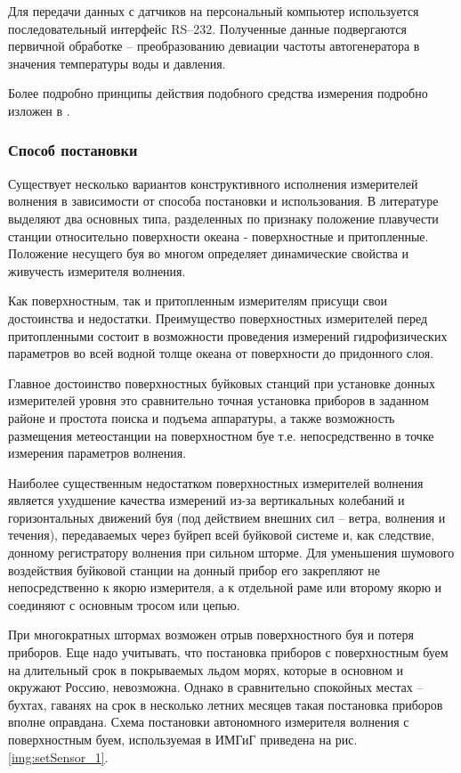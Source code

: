 
Для передачи данных с датчиков на персональный компьютер используется последовательный интерфейс RS–232. Полученные данные подвергаются первичной обработке – преобразованию девиации частоты автогенератора в значения температуры воды и давления.

Более подробно принципы действия подобного средства измерения подробно изложен в \cite{kovalev1993}.


\subsubsection{Способ постановки}
Существует несколько вариантов конструктивного исполнения измерителей волнения в зависимости от способа постановки и использования. В литературе \cite{sensor_fomin} выделяют два основных типа, разделенных по признаку положение плавучести станции относительно поверхности океана - поверхностные и притопленные. Положение несущего буя во многом определяет динамические свойства и живучесть измерителя волнения.

Как поверхностным, так и притопленным измерителям присущи свои достоинства и недостатки. Преимущество поверхностных измерителей перед притопленными состоит в возможности проведения измерений гидрофизических параметров во всей водной толще океана от поверхности до придонного слоя.

Главное достоинство поверхностных буйковых станций при установке донных измерителей уровня это сравнительно точная установка приборов в заданном районе и простота поиска и подъема аппаратуры, а также возможность размещения метеостанции на поверхностном буе т.е. непосредственно в точке измерения параметров волнения.

Наиболее существенным недостатком поверхностных измерителей волнения является ухудшение качества измерений из-за вертикальных колебаний и горизонтальных движений буя (под действием внешних сил – ветра, волнения и течения), передаваемых через буйреп всей буйковой системе и, как следствие, донному регистратору волнения при сильном шторме. Для уменьшения шумового воздействия буйковой станции на донный прибор его закрепляют не непосредственно к якорю измерителя, а к отдельной раме или второму якорю и соединяют с основным тросом или цепью.

При многократных штормах возможен отрыв поверхностного буя и потеря приборов. Еще надо учитывать, что постановка приборов с поверхностным буем на длительный срок в покрываемых льдом морях, которые в основном и окружают Россию, невозможна. Однако в сравнительно спокойных местах – бухтах, гаванях на срок в несколько летних месяцев такая постановка приборов вполне оправдана. Схема постановки автономного измерителя волнения с поверхностным буем, используемая в ИМГиГ приведена на рис. \ref{img:setSensor_1}.

